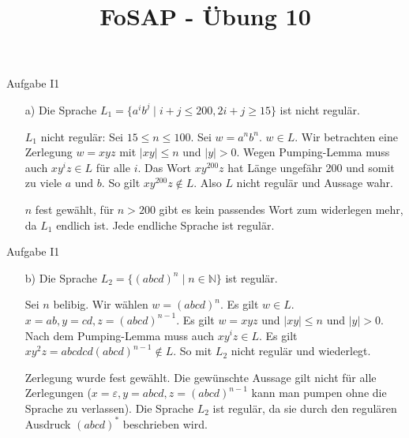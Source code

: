 \documentclass{beamer}
\title[Übung 10]{FoSAP - Übung 10}
\newenvironment{ppl}{\fontfamily{pzc}\selectfont}{\par}
\begin{document}
\begin{frame}{Aufgabe I1}
	\begin{itemize}
		\item[a)] Die Sprache $L_1 = \{a^i b^j \mid i+j \leq 200, 2i+j \geq 15\}$ ist nicht regulär.\pause
		\item[] \begin{ppl}$L_1$ nicht regulär: Sei $15 \leq n \leq 100$. Sei $w = a^n b^n$. $w \in L$. Wir betrachten eine Zerlegung $w = xyz$ mit $\left|xy\right| \leq n$ und $\left|y\right| > 0$. Wegen Pumping-Lemma muss auch $xy^iz \in L$ für alle $i$. Das Wort $xy^{200}z$ hat Länge ungefähr 200 und somit zu viele $a$ und $b$. So gilt $xy^{200}z \notin L$. Also $L$ nicht regulär und Aussage wahr.\end{ppl}\pause
		\alert<+->{$n$ fest gewählt, für $n > 200$ gibt es kein passendes Wort zum widerlegen mehr, da $L_1$ endlich ist. Jede endliche Sprache ist regulär.}
	\end{itemize}
\end{frame}


\begin{frame}{Aufgabe I1}
	\begin{itemize}
		\item[b)] Die Sprache $L_2 = \{(abcd)^n \mid n \in \mathbb{N}\}$ ist regulär.\pause
		\item[] \begin{ppl}Sei $n$ belibig. Wir wählen $w = (abcd)^n$. Es gilt $w \in L$. $x = ab, y = cd, z = (abcd)^{n-1}$. Es gilt $w=xyz$ und $\left| xy \right| \leq n$ und $|y| > 0$. Nach dem Pumping-Lemma muss auch $xy^iz \in L$. Es gilt $xy^2z = abcdcd(abcd)^{n-1} \notin L$. So mit $L_2$ nicht regulär und wiederlegt.\end{ppl}\pause
		\alert<+->{Zerlegung wurde fest gewählt. Die gewünschte Aussage gilt nicht für alle Zerlegungen ($x = \varepsilon, y = abcd, z = (abcd)^{n-1}$ kann man pumpen ohne die Sprache zu verlassen). Die Sprache $L_2$ ist regulär, da sie durch den regulären Ausdruck $(abcd)^\ast$ beschrieben wird.}
	\end{itemize}
\end{frame}
\end{document}
